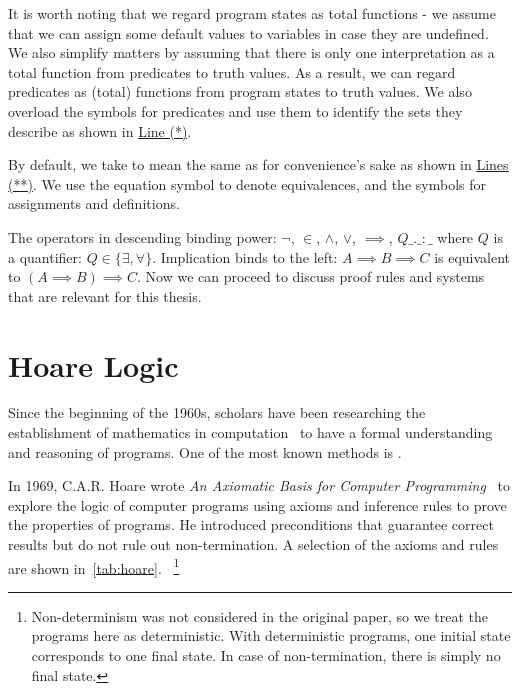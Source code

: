 It is worth noting that we regard program states as total functions - we assume that we can assign some default values to variables in case they are undefined. 
We also simplify matters by assuming that there is only one interpretation as a total function from predicates to truth values. 
As a result, we can regard predicates as (total) functions from program states to truth values. 
We also overload the symbols for predicates and use them to identify the sets they describe as shown in \hyperlink{2.*}{Line (*)}. 

By default, we take  to mean the same as  for convenience's sake as shown in \hyperlink{2.**}{Lines (**)}. 
We use the equation symbol \mathl{=} to denote equivalences, and the symbols \mathl{:=} for assignments and definitions. 

The operators in descending binding power: $\neg$, $\in$, $\wedge$, $\vee$, ${\implies}$, $Q\_.\_:\_$ where $Q$ is a quantifier: $Q\in\{\exists, \forall\}$. Implication binds to the left: $A{\implies} B{\implies} C$ is equivalent to $(A{\implies} B){\implies} C$.
Now we can proceed to discuss proof rules and systems that are relevant for this thesis. 




\section{Hoare Logic}\label{sec:hoare}
Since the beginning of the 1960s, scholars have been researching the establishment of mathematics in computation~\cite{floyd93, mccarthy93} to have a formal understanding and reasoning of programs. 
One of the most known methods is . 

In 1969, C.A.R. Hoare wrote \textit{An Axiomatic Basis for Computer Programming}~\cite{hoare69} to explore the logic of computer programs using axioms and inference rules to prove the properties of programs. 
He introduced  preconditions that  guarantee correct results but do not rule out non-termination. 
A selection of the axioms and rules are shown in~\autoref{tab:hoare}.~
\footnote{Non-determinism was not considered in the original paper, so we treat the programs here as deterministic. 
With deterministic programs, one initial state corresponds to one final state.
In case of non-termination, there is simply no final state. }


